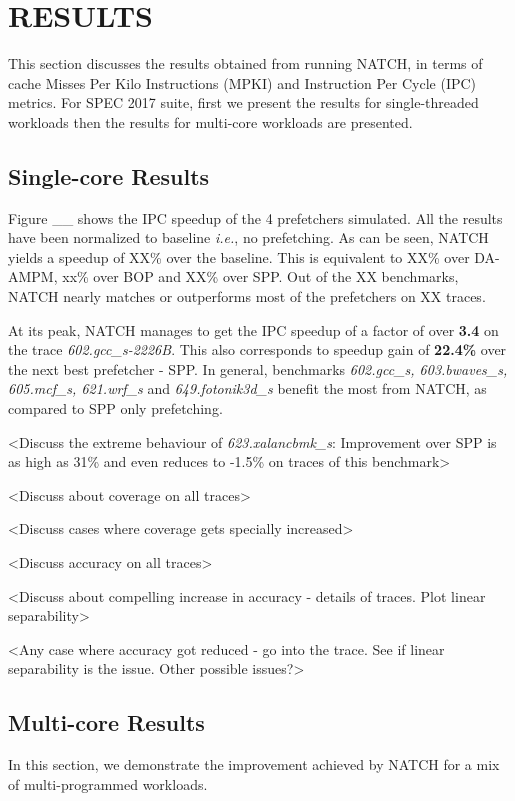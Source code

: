 
\section{RESULTS}
\label{Results}

This section discusses the results obtained from running NATCH, in
terms of cache Misses Per Kilo Instructions (MPKI) and Instruction Per
Cycle (IPC) metrics.  For SPEC 2017 suite, first we present the
results for single-threaded workloads then the results for multi-core
workloads are presented.

\subsection{Single-core Results}
\label{Results-Single}
Figure \_\_ shows the IPC speedup of the 4 prefetchers simulated.  All
the results have been normalized to baseline \textit{i.e.}, no
prefetching.  As can be seen, NATCH yields a speedup of XX\% over
the baseline.  This is equivalent to XX\% over DA-AMPM, xx\% over BOP
and XX\% over SPP.  Out of the XX benchmarks, NATCH nearly matches
or outperforms most of the prefetchers on XX traces.

At its peak, NATCH manages to get the IPC speedup of a factor of
over \textbf{3.4} on the trace \textit{602.gcc\_s-2226B}.  This also
corresponds to speedup gain of \textbf{22.4\%} over the next best
prefetcher - SPP.  In general, benchmarks \textit{602.gcc\_s,
  603.bwaves\_s, 605.mcf\_s, 621.wrf\_s} and \textit{649.fotonik3d\_s}
benefit the most from NATCH, as compared to SPP only prefetching.

<Discuss the extreme behaviour of \textit{623.xalancbmk\_s}:
Improvement over SPP is as high as 31\% and even reduces to -1.5\% on
traces of this benchmark>

<Discuss about coverage on all traces>

<Discuss cases where coverage gets specially increased>

<Discuss accuracy on all traces>

<Discuss about compelling increase in accuracy - details of
traces. Plot linear separability>

<Any case where accuracy got reduced - go into the trace. See if
linear separability is the issue. Other possible issues?>


\subsection{Multi-core Results}
\label{Results-Multi}
In this section, we demonstrate the improvement achieved by NATCH
for a mix of multi-programmed workloads.

